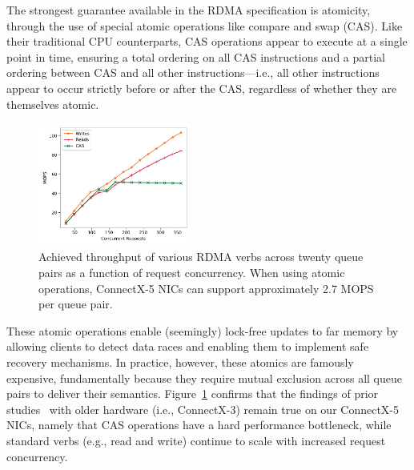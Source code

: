 The strongest guarantee available in the RDMA specification is
atomicity, through the use of special atomic operations like compare
and swap (CAS).  Like their traditional CPU counterparts, CAS
operations appear to execute at a single point in time, ensuring a
total ordering on all CAS instructions and a partial ordering between
CAS and all other instructions---i.e., all other instructions appear
to occur strictly before or after the CAS, regardless of whether they
are themselves atomic.

\begin{figure}[t]
    \includegraphics[width=0.45\textwidth]{fig/rdma_concur.pdf}
    \caption{Achieved throughput of various RDMA verbs across twenty queue pairs as a function of request concurrency.  When using atomic operations, ConnectX-5 NICs can support approximately 2.7 MOPS per queue pair.}
    \label{fig:rdma_concur}
\end{figure}

These atomic operations enable (seemingly) lock-free updates to far
memory by allowing clients to detect data races and enabling them to
implement safe recovery mechanisms. In practice, however, these
atomics are famously~\cite{design-guidelines,clover} expensive,
fundamentally because they require mutual exclusion across all queue
pairs to deliver their semantics.  Figure~\ref{fig:rdma_concur}
confirms that the findings of prior
studies~\cite[Fig. 14]{design-guidelines} with older hardware (i.e.,
ConnectX-3) remain true on our ConnectX-5 NICs, namely that CAS
operations have a hard performance bottleneck, while standard verbs
(e.g., read and write) continue to scale with increased request
concurrency.

